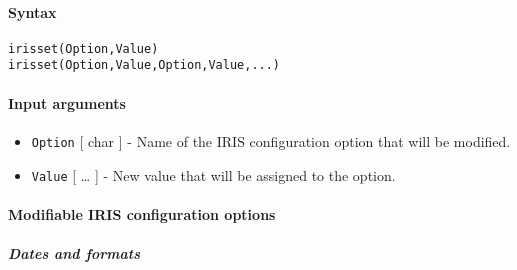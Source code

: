 


	\paragraph{Syntax}

\begin{verbatim}
irisset(Option,Value)
irisset(Option,Value,Option,Value,...)
\end{verbatim}

\paragraph{Input arguments}

\begin{itemize}
\item
  \texttt{Option} {[} char {]} - Name of the IRIS configuration option
  that will be modified.
\item
  \texttt{Value} {[} \ldots{} {]} - New value that will be assigned to
  the option.
\end{itemize}

\paragraph{Modifiable IRIS configuration
options}

\subparagraph{Dates and formats}

